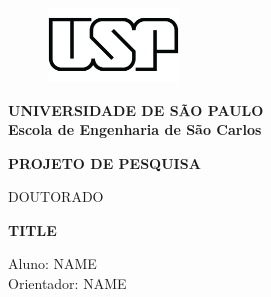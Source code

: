 \documentclass[a4paper,12pt]{article}
\begin{document}



 
\addtocounter{page}{-1}
\thispagestyle{empty}
    
\vspace{-4.0cm}
\begin{figure}[t]
	\centering
		\includegraphics[width=0.31\textwidth]{USP.jpg}
	\label{fig:USP}
\end{figure}

\begin{center}
	\vspace{2 cm}
	\Large{\textbf{UNIVERSIDADE DE SÃO PAULO}}\\[0.5cm]

\large{\bf Escola de Engenharia de São Carlos}\\[0.5cm]

\end{center}

\doublespacing	

\vspace{1.5 cm}
\begin{center}
{\bf PROJETO DE PESQUISA
	
DOUTORADO}
\end{center}

\vspace{1.5 cm}
\begin{center}
	\Large{\textbf{TITLE} }
\end{center}

\singlespacing

\vspace{2 cm}
\begin{center}
	
Aluno: NAME\\[0.5cm]
	
Orientador: NAME
\end{center}
\end{document}
